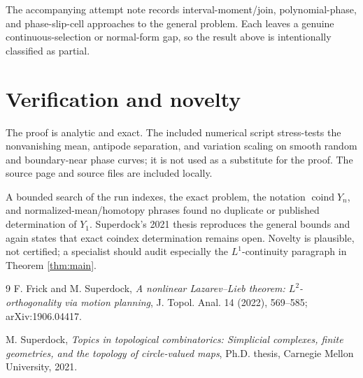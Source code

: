 \documentclass[10pt,a4paper]{article}
\newcommand{\coind}{\operatorname{coind}}
\begin{document}
The accompanying attempt note records interval-moment/join, polynomial-phase,
and phase-slip-cell approaches to the general problem.  Each leaves a genuine
continuous-selection or normal-form gap, so the result above is intentionally
classified as partial.

\section{Verification and novelty}

The proof is analytic and exact.  The included numerical script stress-tests
the nonvanishing mean, antipode separation, and variation scaling on smooth
random and boundary-near phase curves; it is not used as a substitute for the
proof.  The source page and source files are included locally.

A bounded search of the run indexes, the exact problem, the notation
\(\coind Y_n\), and normalized-mean/homotopy phrases found no duplicate or
published determination of \(Y_1\).  Superdock's 2021 thesis reproduces the
general bounds and again states that exact coindex determination remains open.
Novelty is plausible, not certified; a specialist should audit especially the
\(L^1\)-continuity paragraph in Theorem \ref{thm:main}.

\begin{thebibliography}{9}
F. Frick and M. Superdock,
\emph{A nonlinear Lazarev--Lieb theorem: \(L^2\)-orthogonality via motion
planning}, J. Topol. Anal. 14 (2022), 569--585; arXiv:1906.04417.

M. Superdock,
\emph{Topics in topological combinatorics: Simplicial complexes, finite
geometries, and the topology of circle-valued maps}, Ph.D. thesis, Carnegie
Mellon University, 2021.
\end{thebibliography}
\end{document}
